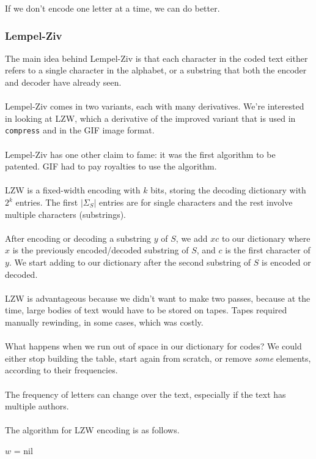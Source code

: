 \documentclass[]{article}
\theoremstyle{definition}
\begin{document}
				If we don't encode one letter at a time, we can do better.

			\subsubsection{Lempel-Ziv}
				The main idea behind Lempel-Ziv is that each character in the coded text either refers to a single character in the alphabet, or a substring that both the encoder and decoder have already seen.
				\\ \\
				Lempel-Ziv comes in two variants, each with many derivatives. We're interested in looking at LZW, which a derivative of the improved variant that is used in \verb+compress+ and in the GIF image format.
				\\ \\
				Lempel-Ziv has one other claim to fame: it was the first algorithm to be patented. GIF had to pay royalties to use the algorithm.
				\\ \\
				LZW is a fixed-width encoding with $k$ bits, storing the decoding dictionary with $2^k$ entries. The first $|\Sigma_S|$ entries are for single characters and the rest involve multiple characters (substrings).
				\\ \\
				After encoding or decoding a substring $y$ of $S$, we add $xc$ to our dictionary where $x$ is the previously encoded/decoded substring of $S$, and $c$ is the first character of $y$. We start adding to our dictionary after the second substring of $S$ is encoded or decoded.
				\\ \\
				LZW is advantageous because we didn't want to make two passes, because at the time, large bodies of text would have to be stored on tapes. Tapes required manually rewinding, in some cases, which was costly.
				\\ \\
				What happens when we run out of space in our dictionary for codes? We could either stop building the table, start again from scratch, or remove \emph{some} elements, according to their frequencies.
				\\ \\
				The frequency of letters can change over the text, especially if the text has multiple authors.
				\\ \\
				The algorithm for LZW encoding is as follows. \\
				\begin{algorithm}[H]
					$w$ = nil\;
				\end{algorithm}
\end{document}
